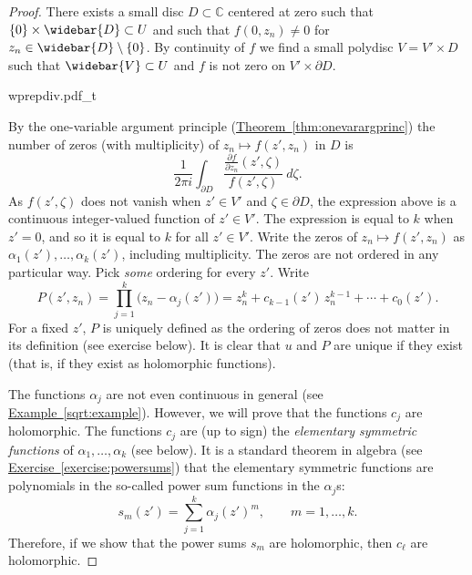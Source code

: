 \documentclass[12pt,openany]{book}
\newcommand{\C}{{\mathbb{C}}}
\theoremstyle{plain}
\theoremstyle{remark}
\theoremstyle{definition}
\newenvironment{myfig}{%
    \begin{center}
}{%
    \end{center}
}
\theoremstyle{exercise}
\theoremstyle{example}
\newcommand{\exerciseref}[1]{\hyperref[#1]{Exercise~\ref*{#1}}}
\newcommand{\exampleref}[1]{\hyperref[#1]{Example~\ref*{#1}}}
\newcommand{\thmref}[1]{\hyperref[#1]{Theorem~\ref*{#1}}}
\begin{document}
\begin{proof}
There exists a small disc $D \subset \C$ centered at zero such that
$\{0\} \times \widebar{D} \subset U$ and such that
$f(0,z_n) \not= 0$ for $z_n \in \widebar{D} \setminus \{ 0 \}$.
By continuity
of $f$ we find a small polydisc $V = V' \times D$ such that
$\widebar{V} \subset U$ and $f$ is not zero on
$V' \times \partial D$.

\begin{myfig}
{wprepdiv.pdf_t}
\end{myfig}

By the one-variable argument principle (\thmref{thm:onevarargprinc}) the number of zeros (with
multiplicity) of $z_n
\mapsto f(z',z_n)$ in $D$ is
\begin{equation*}
\frac{1}{2\pi i}
\int_{\partial D}
\frac{\frac{\partial f}{\partial z_n} (z',\zeta)}{f(z',\zeta)} ~d\zeta .
\end{equation*}
As $f(z',\zeta)$ does not vanish when $z' \in V'$ and $\zeta \in \partial
D$,
the expression above is a continuous integer-valued
function of $z' \in V'$.
The expression
is equal to $k$ when $z'=0$, and
so it is equal to $k$ for all $z' \in V'$.
Write
the zeros of $z_n \mapsto f(z',z_n)$ as $\alpha_1(z'),\ldots,\alpha_k(z')$, including
multiplicity.  The zeros are not ordered in any particular way.
Pick \emph{some} ordering for every $z'$.
Write
\begin{equation*}
P(z',z_n)
=
\prod_{j=1}^k \bigl(z_n-\alpha_j(z')\bigr)
=
z_n^k + c_{k-1}(z') \, z_n^{k-1} + \cdots + c_0 (z') .
\end{equation*}
For a fixed $z'$, $P$ is uniquely defined as the ordering of zeros does not
matter in its definition (see exercise below).  It is
clear that
$u$ and $P$ are unique if they exist (that is, if they exist as holomorphic functions).

The functions $\alpha_j$ are not even continuous in general (see
\exampleref{sqrt:example}).  However,
we will prove that the functions $c_j$ are holomorphic.  The functions
$c_j$ are
(up to sign)
the \emph{elementary symmetric functions}
of $\alpha_1,\ldots,\alpha_k$ (see below).  It is a standard
theorem in algebra
(see \exerciseref{exercise:powersums})
that the elementary symmetric functions are
polynomials in the so-called power sum functions in the $\alpha_j$s:
\begin{equation*}
s_m(z') = \sum_{j=1}^k \alpha_j{(z')}^m , \qquad m = 1,\ldots,k.
\end{equation*}
Therefore, if we show that the power sums $s_m$ are holomorphic, then
$c_\ell$ are 
holomorphic.


\end{proof}
\end{document}

